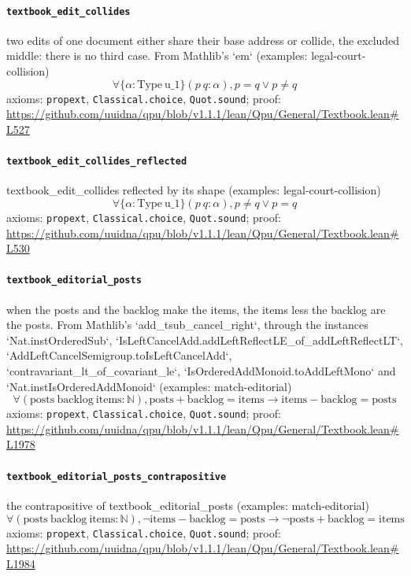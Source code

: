 \documentclass[11pt]{article}
\begin{document}
\paragraph{\texttt{textbook\_edit\_collides}}
two edits of one document either share their base address or collide, the excluded middle: there is no third case. From Mathlib's `em` (examples: legal-court-collision)
\[ \forall \{\alpha : \mathrm{Type}\ \mathrm{u\_1}\} (p\ q : \alpha ), p = q \lor p \ne q \]
\noindent axioms: \texttt{propext}, \texttt{Classical.choice}, \texttt{Quot.sound}; proof: \url{https://github.com/uuidna/qpu/blob/v1.1.1/lean/Qpu/General/Textbook.lean\#L527}

\paragraph{\texttt{textbook\_edit\_collides\_reflected}}
textbook\_edit\_collides reflected by its shape (examples: legal-court-collision)
\[ \forall \{\alpha : \mathrm{Type}\ \mathrm{u\_1}\} (p\ q : \alpha ), p \ne q \lor p = q \]
\noindent axioms: \texttt{propext}, \texttt{Classical.choice}, \texttt{Quot.sound}; proof: \url{https://github.com/uuidna/qpu/blob/v1.1.1/lean/Qpu/General/Textbook.lean\#L530}

\paragraph{\texttt{textbook\_editorial\_posts}}
when the posts and the backlog make the items, the items less the backlog are the posts. From Mathlib's `add\_tsub\_cancel\_right`, through the instances `Nat.instOrderedSub`, `IsLeftCancelAdd.addLeftReflectLE\_of\_addLeftReflectLT`, `AddLeftCancelSemigroup.toIsLeftCancelAdd`, `contravariant\_lt\_of\_covariant\_le`, `IsOrderedAddMonoid.toAddLeftMono` and `Nat.instIsOrderedAddMonoid` (examples: match-editorial)
\[ \forall (\mathrm{posts}\ \mathrm{backlog}\ \mathrm{items} : \mathbb{N}), \mathrm{posts} + \mathrm{backlog} = \mathrm{items} \to \mathrm{items} - \mathrm{backlog} = \mathrm{posts} \]
\noindent axioms: \texttt{propext}, \texttt{Classical.choice}, \texttt{Quot.sound}; proof: \url{https://github.com/uuidna/qpu/blob/v1.1.1/lean/Qpu/General/Textbook.lean\#L1978}

\paragraph{\texttt{textbook\_editorial\_posts\_contrapositive}}
the contrapositive of textbook\_editorial\_posts (examples: match-editorial)
\[ \forall (\mathrm{posts}\ \mathrm{backlog}\ \mathrm{items} : \mathbb{N}), \neg \mathrm{items} - \mathrm{backlog} = \mathrm{posts} \to \neg \mathrm{posts} + \mathrm{backlog} = \mathrm{items} \]
\noindent axioms: \texttt{propext}, \texttt{Classical.choice}, \texttt{Quot.sound}; proof: \url{https://github.com/uuidna/qpu/blob/v1.1.1/lean/Qpu/General/Textbook.lean\#L1984}
\end{document}
